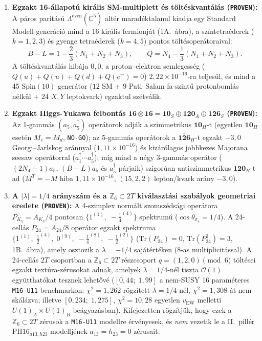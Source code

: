 \documentclass[11pt,a4paper]{article}
\begin{document}
\begin{enumerate}
    \item \textbf{Egzakt 16-állapotú királis SM-multiplett és töltéskvantálás (\texttt{PROVEN}):} A páros paritású $\Lambda^{\mathrm{even}}(\mathbb{C}^5)$ altér maradéktalanul kiadja egy Standard Modell-generáció mind a 16 királis fermionját (1A.~ábra), a színtetraéderek ($k=1,2,3$) és gyenge tetraéderek ($k=4,5$) pontos töltésoperátoraival:
    \begin{equation}
        B - L = 1 - \frac{2}{3}(N_1 + N_2 + N_3), \qquad Q = N_4 - \frac{1}{3}(N_1 + N_2 + N_3).
        \label{eq:charge-quant-hu}
    \end{equation}
    A töltéskvantálás hibája $0{,}0$, a proton--elektron semlegesség ($Q(u)+Q(u)+Q(d)+Q(e^-)=0$) $2{,}22\times 10^{-16}$-ra teljesül, és mind a 45 $\mathrm{Spin}(10)$ generátor ($12$ SM + $9$ Pati--Salam fa-szintű protonbomlás nélkül + $24$ $X,Y$ leptokvark) egzaktul szétválik.
    \item \textbf{Egzakt Higgs-Yukawa felbontás $\mathbf{16}\otimes\mathbf{16} = \mathbf{10}_S \oplus \mathbf{120}_A \oplus \overline{\mathbf{126}}_S$ (\texttt{PROVEN}):}
    Az 1-gammás $(a_5, a_5^\dagger)$ operátorok adják a szimmetrikus $\mathbf{10}_H$-t (egyetlen $\mathbf{10}_H$ esetén $M_e = M_d$, \texttt{NO-GO}); az 5-gammás operátorok a $\overline{\mathbf{126}}_H$-t egzakt $-3{,}0$ Georgi--Jarlskog aránnyal ($1{,}11\times 10^{-16}$) és kizárólagos jobbkezes Majorana seesaw operátorral ($a_1^\dagger\cdots a_5^\dagger$); míg mind a négy 3-gammás operátor ($(2N_4-1)a_5$, $(B-L)a_5$ és $a_5^\dagger$ párjaik) szigorúan antiszimmetrikus $\mathbf{120}_H$-t ad ($M^T = -M$ hiba $1{,}11\times 10^{-16}$, $(15,2,2)$ lepton/kvark arány $-3{,}0$).
    \item \textbf{A $|\lambda| = 1/4$ arányszám és a $\mathbb{Z}_6 \subset 2T$ kiválasztási szabályok geometriai eredete (\texttt{PROVEN}):}
    A 4-szimplex normált szomszédsági operátora $P_{K_5} = A_{K_5}/4$ pontosan $\{1^{(1)},\; -\tfrac{1}{4}^{(4)}\}$ spektrumú ($\cos\theta_{\sigma_4} = 1/4$). A 24-cellás $P_{24} = A_{24}/8$ operátor egzakt spektruma $\{1^{(1)},\; \tfrac{1}{2}^{(4)},\; 0^{(9)},\; -\tfrac{1}{4}^{(8)},\; -\tfrac{1}{2}^{(2)}\}$ ($\mathrm{Tr}(P_{24}) = 0$, $\mathrm{Tr}(P_{24}^2) = 3$, 1B.~ábra), amely osztozik a $\lambda = -1/4$ sajátértéken (8-as multiplicitással). A 24-cellás $2T$ csoportban a $\mathbb{Z}_6 \subset 2T$ részcsoport $q=(1,2,0)\pmod 6$ töltései egzakt textúra-zérusokat adnak, amelyek $\lambda = 1/4$-nél tiszta $\mathcal{O}(1)$ együtthatókat tesznek lehetővé ($[0{,}44;\; 1{,}99]$ a nem-SUSY 16 paraméteres \texttt{M16-U11} benchmarkon: $\chi^2 = 1{,}262$ rögzített $\lambda=1/4$-nél, $\chi^2 = 1{,}308$ át nem skálázva; illetve $[0{,}234;\; 1{,}275]$, $\chi^2 = 10{,}28$ egyetlen $v_{\mathrm{EW}}$ melletti $U(1)_A\times U(1)_B$ beágyazásban). Kifejezetten rögzítjük, hogy ezek a $\mathbb{Z}_6 \subset 2T$ zérusok a \texttt{M16-U11} modellre érvényesek, és \emph{nem} vezetik le a II.\ pillér $\mathrm{PH16}_{a13,h23}$ modelljének $a_{13}=h_{23}=0$ zérusait.
\end{enumerate}
\end{document}
